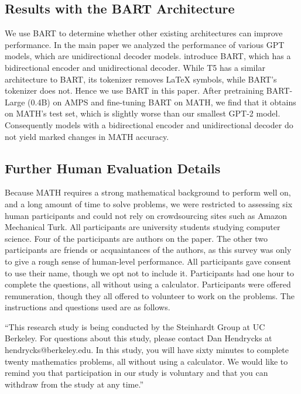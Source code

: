 \documentclass{article}
\begin{document}
\subsection{Results with the BART Architecture}
We use BART \citep{Lewis2020BARTDS} to determine whether other existing architectures can improve performance.
In the main paper we analyzed the performance of various GPT models, which are unidirectional decoder models. 
\cite{Lewis2020BARTDS} introduce BART, which has a bidirectional encoder and unidirectional decoder. While T5 has a similar architecture to BART, its tokenizer removes \LaTeX{} symbols, while BART's tokenizer does not. Hence we use BART in this paper. After pretraining BART-Large (0.4B) on AMPS and fine-tuning BART on MATH, we find that it obtains  on MATH's test set, which is slightly worse than our smallest GPT-2 model. Consequently models with a bidirectional encoder and unidirectional decoder do not yield marked changes in MATH accuracy.

\subsection{Further Human Evaluation Details}
Because MATH requires a strong mathematical background to perform well on, and a long amount of time to solve problems, we were restricted to assessing six human participants and could not rely on crowdsourcing sites such as Amazon Mechanical Turk. All participants are university students studying computer science. Four of the participants are authors on the paper. The other two participants are friends or acquaintances of the authors, as this survey was only to give a rough sense of human-level performance. All participants gave consent to use their name, though we opt not to include it. Participants had one hour to complete the questions, all without using a calculator. Participants were offered remuneration, though they all offered to volunteer to work on the problems. The instructions and questions used are as follows.


``This research study is being conducted by the Steinhardt Group at UC Berkeley. For questions about this study, please contact Dan Hendrycks at hendrycks@berkeley.edu. In this study, you will have sixty minutes to complete twenty mathematics problems, all without using a calculator. We would like to remind you that participation in our study is voluntary and that you can withdraw from the study at any time.''
\end{document}
